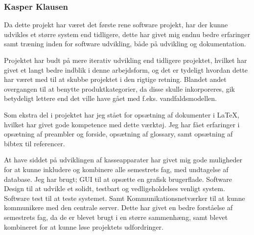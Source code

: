 \subsubsection{Kasper Klausen}

Da dette projekt har været det første rene software projekt, har der kunne udvikles et større system end tidligere, dette har givet mig endnu bedre erfaringer samt træning inden for software udvikling, både på udvikling og dokumentation.

Projektet har budt på mere iterativ udvikling end tidligere projektet, hvilket har givet et langt bedre indblik i denne arbejdsform, og det er tydeligt hvordan dette har været med til at skubbe projektet i den rigtige retning. Blandet andet overgangen til at benytte produktkategorier, da disse skulle inkorporeres, gik betydeligt lettere end det ville have gået med f.eks. vandfaldsmodellen.

Som ekstra del i projektet har jeg stået for opsætning af dokumenter i LaTeX, hvilket har givet gode kompetence med dette værktøj. Jeg har fået erfaringer i opsætning af preambler og forside, opsætning af glossary, samt opsætning af bibtex til referencer.

At have siddet på udviklingen af kasseapparater har givet mig gode muligheder for at kunne inkludere og kombinere alle semestrets fag, med undtagelse af database. Jeg har brugt; GUI til at opsætte en grafisk brugerflade. Software Design til at udvikle et solidt, testbart og vedligeholdelses venligt system. Software test til at teste systemet. Samt Kommunikationsnetværker til at kunne kommunikere med den centrale server. Dette har givet en bedre forståelse af semestrets fag, da de er blevet brugt i en større sammenhæng, samt blevet kombineret for at kunne løse projektets udfordringer. 

